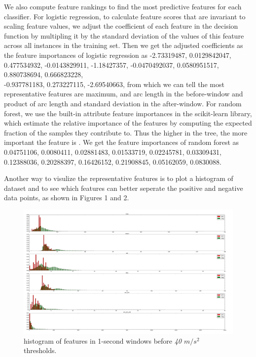 \documentclass{soups}
\begin{document}
We also compute feature rankings to find the most predictive features for each classifier. 
For logistic regression, to calculate feature scores that are invariant to scaling feature values, we adjust the coefficient of each feature in the decision function by multipling it by the standard deviation of the values of this feature across all instances in the training set. 
Then we get the adjusted coefficients as the feature importances of logistic regression as -2.73319487, 0.0129842047, 0.477534932, -0.0143829911, -1.18427357, -0.0470492037, 0.0580951517, 0.880738694, 0.666823228, \\-0.937781183, 0.273227115, -2.69540663, from which we can tell the most representative features are maximum, and arc length in the before-window and product of arc length and standard deviation in the after-window. 
For random forest, we use the built-in attribute feature importances in the scikit-learn library, which estimate the relative importance of the features by computing the expected fraction of the samples they contribute to. 
Thus the higher in the tree, the more important the feature is \cite{sklearn:rfdoc}. 
We get the feature importances of random forest as 0.04751106, 0.0080411, 0.02881483, 0.01533719, 0.02245781, 0.03309431, 0.12388036, 0.20288397, 0.16426152, 0.21908845, 0.05162059, 0.0830088.

Another way to visulize the representative features is to plot a histogram of dataset and to see which features can better seperate the positive and negative data points, as shown in Figures 1 and 2.

\begin{figure}[H]
\begin{center}
\includegraphics[width=1.0\columnwidth]{hist_features_before_win_size_1_2.png}
\end{center}
\caption{histogram of features in 1-second windows before \textit{40 $m/s^2$} thresholds.}
\end{figure}
\end{document}
